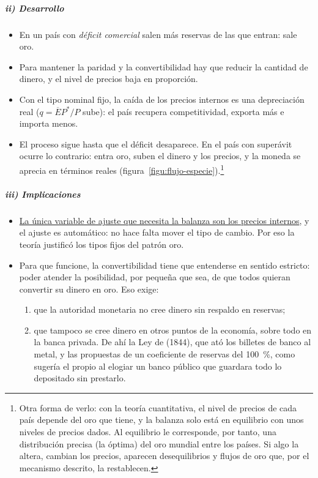 \documentclass[11pt]{article}
\begin{document}
\subparagraph{ii) Desarrollo}

\begin{itemize}
\item En un país con \emph{déficit comercial} salen más reservas de las que entran: sale oro.
\item Para mantener la paridad y la convertibilidad hay que reducir la cantidad de dinero, y el nivel de precios baja en proporción.
\item Con el tipo nominal fijo, la caída de los precios internos es una depreciación real ($q=\overline EP^*/P$ sube): el país recupera competitividad, exporta más e importa menos.
\item El proceso sigue hasta que el déficit desaparece. En el país con superávit ocurre lo contrario: entra oro, suben el dinero y los precios, y la moneda se aprecia en términos reales (figura~\ref{figu:flujo-especie}).\footnote{Otra forma de verlo: con la teoría cuantitativa, el nivel de precios de cada país depende del oro que tiene, y la balanza solo está en equilibrio con unos niveles de precios dados. Al equilibrio le corresponde, por tanto, una distribución precisa (la óptima) del oro mundial entre los países. Si algo la altera, cambian los precios, aparecen desequilibrios y flujos de oro que, por el mecanismo descrito, la restablecen.}
\end{itemize}

\begin{infografia}[H]
\centering
\caption{El mecanismo flujo-especie}\label{figu:flujo-especie}
\end{infografia}

\subparagraph{iii) Implicaciones}

\begin{itemize}
\item \uline{La única variable de ajuste que necesita la balanza son los precios internos}, y el ajuste es automático: no hace falta mover el tipo de cambio. Por eso la teoría justificó los tipos fijos del patrón oro.
\item Para que funcione, la convertibilidad tiene que entenderse en sentido estricto: poder atender la posibilidad, por pequeña que sea, de que todos quieran convertir su dinero en oro. Eso exige:
  \begin{enumerate}
  \item que la autoridad monetaria no cree dinero sin respaldo en reservas;
  \item que tampoco se cree dinero en otros puntos de la economía, sobre todo en la banca privada. De ahí la Ley de  (1844), que ató los billetes de banco al metal, y las propuestas de un coeficiente de reservas del 100~\%, como sugería el propio  al elogiar un banco público que guardara todo lo depositado sin prestarlo.
  \end{enumerate}
\end{itemize}
\end{document}
